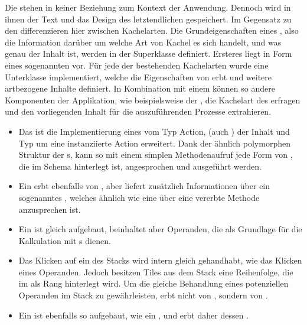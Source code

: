 Die  stehen in keiner Beziehung zum Kontext der Anwendung. Dennoch wird in ihnen der Text und das Design des letztendlichen  gespeichert. Im Gegensatz zu den  differenzieren  hier zwischen Kachelarten. Die Grundeigenschaften eines , also die Information darüber um welche Art von Kachel es sich handelt, und was genau der Inhalt ist, werden in der Superklasse  definiert. Ersteres liegt in Form eines sogenannten  vor. Für jede der bestehenden Kachelarten wurde eine Unterklasse implementiert, welche die Eigenschaften von  erbt und weitere artbezogene Inhalte definiert. In Kombination mit einem  können so andere Komponenten der Applikation, wie beispielsweise der , die Kachelart des  erfragen und den vorliegenden Inhalt für die auszuführenden Prozesse extrahieren.

\begin{itemize}
	\item Das  ist die Implementierung eines  vom Typ Action, (auch ) der Inhalt und Typ um eine instanziierte Action erweitert. Dank der ähnlich polymorphen Struktur der s, kann so mit einem simplen Methodenaufruf jede Form von , die im Schema hinterlegt ist, angesprochen und ausgeführt werden.
	\item Ein  erbt ebenfalls von , aber liefert zusätzlich Informationen über ein sogenanntes , welches ähnlich wie eine  über eine vererbte Methode anzusprechen ist.
	\item Ein  ist gleich aufgebaut, beinhaltet aber Operanden, die als Grundlage für die Kalkulation mit s dienen.
	\item Das Klicken auf ein  des Stacks wird intern gleich gehandhabt, wie das Klicken eines Operanden. Jedoch besitzen Tiles aus dem Stack eine Reihenfolge, die im  als Rang hinterlegt wird. Um die gleiche Behandlung eines potenziellen Operanden im Stack zu gewährleisten, erbt  nicht von , sondern von . 
	\item Ein  ist ebenfalls so aufgebaut, wie ein , und erbt daher dessen .
\end{itemize}

